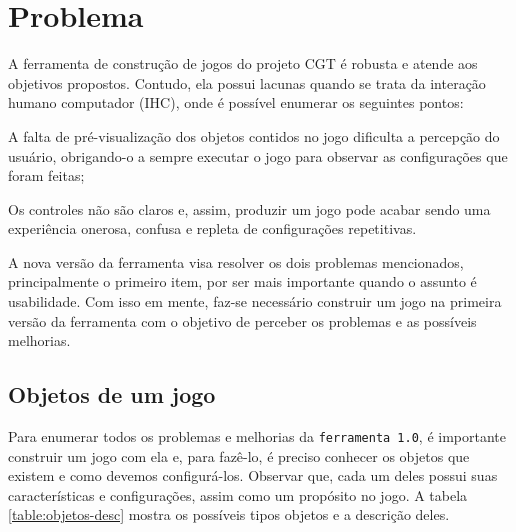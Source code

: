 \documentclass[12pt,twoside,openright,a4paper,english,brazil,sumario=tradicional]{abntex2}
\begin{document}
\chapter{Problema}
\label{chap:problemas}
A ferramenta de construção de jogos do projeto CGT é robusta e atende aos objetivos propostos. Contudo, ela possui lacunas quando se trata da interação humano computador (IHC), onde é possível enumerar os seguintes pontos:

\begin{alineas}
\item A falta de pré-visualização dos objetos contidos no jogo dificulta a percepção do usuário, obrigando-o a sempre executar o jogo para observar as configurações que foram feitas;
\item Os controles não são claros e, assim, produzir um jogo pode acabar sendo uma experiência onerosa, confusa e repleta de configurações repetitivas.
\end{alineas}

A nova versão da ferramenta visa resolver os dois problemas mencionados, principalmente o primeiro item, por ser mais importante quando o assunto é usabilidade. Com isso em mente, faz-se necessário construir um jogo na primeira versão da ferramenta com o objetivo de perceber os problemas e as possíveis melhorias.

\section{Objetos de um jogo}
\label{sec:objetos}

Para enumerar todos os problemas e melhorias da \texttt{ferramenta 1.0}, é importante construir um jogo com ela e, para fazê-lo, é preciso conhecer os objetos que existem e como devemos configurá-los. Observar que, cada um deles possui suas características e configurações, assim como um propósito no jogo. A tabela \ref{table:objetos-desc} mostra os possíveis tipos objetos e a descrição deles.
\end{document}
